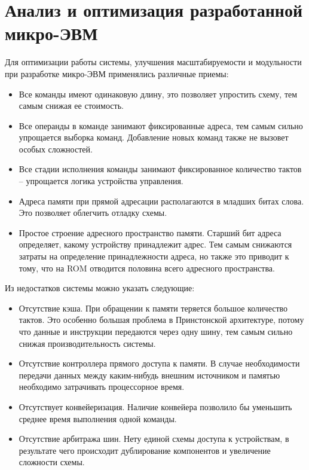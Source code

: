 \section{Анализ и оптимизация разработанной микро-ЭВМ}
Для оптимизации работы системы, улучшения масштабируемости и модульности при разработке микро-ЭВМ применялись различные приемы:

    \begin{itemize}
        \item Все команды имеют одинаковую длину, это позволяет упростить схему, тем самым снижая ее стоимость.
        \item Все операнды в команде занимают фиксированные адреса, тем самым сильно упрощается выборка команд. Добавление новых команд также не вызовет особых сложностей.
        \item Все стадии исполнения команды занимают фиксированное количество тактов -- упрощается логика устройства управления.
        \item Адреса памяти при прямой адресации располагаются в младших битах слова. Это позволяет облегчить отладку схемы.
        \item Простое строение адресного пространство памяти. Старший бит адреса определяет, какому устройству принадлежит адрес. Тем самым снижаются затраты на определение принадлежности адреса, но также это приводит к тому, что на ROM отводится половина всего адресного пространства.
    \end{itemize}

	Из недостатков системы можно указать следующие:
    \begin{itemize}
        \item Отсутствие кэша. При обращении к памяти теряется большое количество тактов. Это особенно большая проблема в Принстонской архитектуре, потому что данные и инструкции передаются через одну шину, тем самым сильно снижая производительность системы.
        \item Отсутствие контроллера прямого доступа к памяти. В случае необходимости передачи данных между каким-нибудь внешним источником и памятью необходимо затрачивать процессорное время.
        \item Отсутствует конвейеризация. Наличие конвейера позволило бы уменьшить среднее время выполнения одной команды.
        \item Отсутствие арбитража шин. Нету единой схемы доступа к устройствам, в результате чего происходит дублирование компонентов и увеличение сложности схемы.
    \end{itemize}

